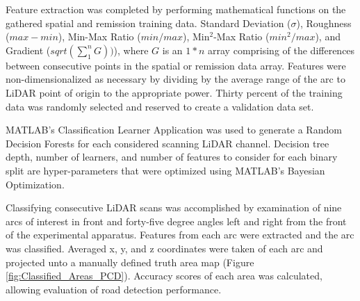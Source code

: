 \documentclass[journal,onecolumn]{IEEEtran}
\begin{document}


	{Feature extraction was completed by performing mathematical functions on the gathered spatial and remission training data. Standard Deviation ($\sigma$), Roughness ($max - min$), Min-Max Ratio ($min / max$), Min$^{2}$-Max Ratio ($min^2 / max$), and Gradient ($sqrt(\sum_{1}^{n} G))$), where $G$ is an $1*n$ array comprising of the differences between consecutive points in the spatial or remission data array. Features were non-dimensionalized as necessary by dividing by the average range of the arc to LiDAR point of origin to the appropriate power. Thirty percent of the training data was randomly selected and reserved to create a validation data set.} 
	
	{MATLAB's Classification Learner Application was used to generate a Random Decision Forests for each considered scanning LiDAR channel. Decision tree depth, number of learners, and number of features to consider for each binary split are hyper-parameters that were optimized using MATLAB's Bayesian Optimization.}

	{Classifying consecutive LiDAR scans was accomplished by examination of nine arcs of interest in front and forty-five degree angles left and right from the front of the experimental apparatus. Features from each arc were extracted and the arc was classified. Averaged x, y, and z coordinates were taken of each arc and projected unto a manually defined truth area map (Figure \ref{fig:Classified_Areas_PCD}). Accuracy scores of each area was calculated, allowing evaluation of road detection performance.}
	
\end{document}

